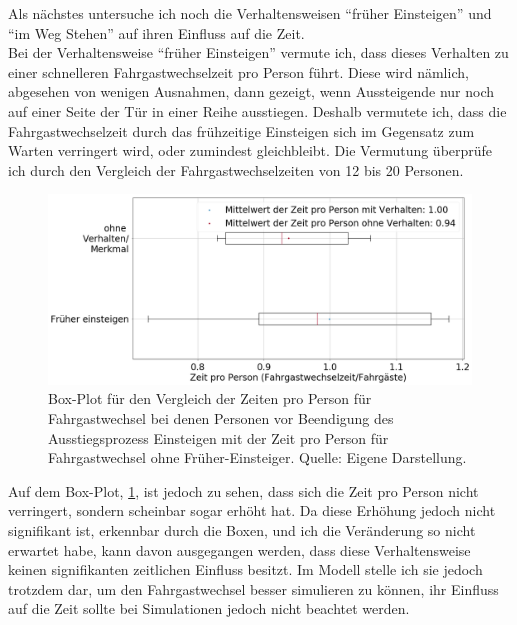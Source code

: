 Als nächstes untersuche ich noch die Verhaltensweisen "`früher Einsteigen"' und "`im Weg Stehen"' auf ihren Einfluss auf die Zeit.\\
Bei der Verhaltensweise "`früher Einsteigen"' vermute ich, dass dieses Verhalten zu einer schnelleren Fahrgastwechselzeit pro Person führt. Diese wird nämlich, abgesehen von wenigen Ausnahmen, dann gezeigt, wenn Aussteigende nur noch auf einer Seite der Tür in einer Reihe ausstiegen. Deshalb vermutete ich, dass die Fahrgastwechselzeit durch das frühzeitige Einsteigen sich im Gegensatz zum Warten verringert wird, oder zumindest gleichbleibt. Die Vermutung überprüfe ich durch den Vergleich der Fahrgastwechselzeiten von 12 bis 20 Personen.
\begin{figure}[H]
	\centering
		\includegraphics[height=0.3\textwidth]{pictures/data_evaluation/behavior/comp_Fruehereinsteigen.png}
	\caption{Box-Plot für den Vergleich der Zeiten pro Person für Fahrgastwechsel bei denen Personen vor Beendigung des Ausstiegsprozess Einsteigen mit der Zeit pro Person für Fahrgastwechsel ohne Früher-Einsteiger. Quelle: Eigene Darstellung.}
	\label{fig:BoxPlotFrueherEinsteigen}
\end{figure} Auf dem Box-Plot, \figurename \ref{fig:BoxPlotFrueherEinsteigen}, ist jedoch zu sehen, dass sich die Zeit pro Person nicht verringert, sondern scheinbar sogar erhöht hat. Da diese Erhöhung jedoch nicht signifikant ist, erkennbar durch die Boxen, und ich die Veränderung so nicht erwartet habe, kann davon ausgegangen werden, dass diese Verhaltensweise keinen signifikanten zeitlichen Einfluss besitzt. Im Modell stelle ich sie jedoch trotzdem dar, um den Fahrgastwechsel besser simulieren zu können, ihr Einfluss auf die Zeit sollte bei Simulationen jedoch nicht beachtet werden.

